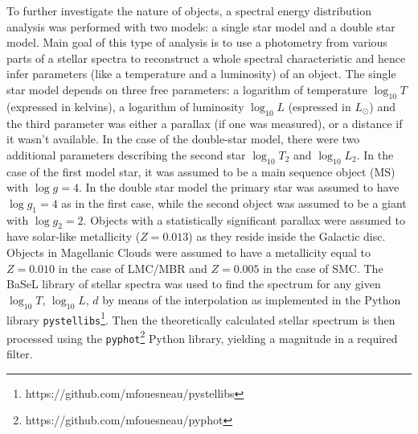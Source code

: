\documentclass{pracalicmgr}
\begin{document}
To further investigate the nature of objects, a spectral energy distribution analysis was
performed with two models: a single star model and a double star model. Main goal of this type of analysis is to use a photometry from various parts of a stellar spectra to
reconstruct a whole spectral characteristic and hence infer parameters (like a temperature and a luminosity) of an object.
The single star model depends on three free parameters: a logarithm of temperature $\log_{10}T$ (expressed in kelvins), a logarithm of luminosity $\log_{10} L$ (espressed in $L_{\odot}$) and the third
parameter was either a parallax (if one was measured), or a distance if it wasn't available. In the case of the double-star model, there were two additional parameters describing the
second star $\log_{10} T_2$ and $\log_{10} L_2$. In the case of the first model star, it was assumed to be a main sequence object (MS) with $\log{g}=4$. In the double star model the primary star
was assumed to have $\log{g_1}=4$ as in the first case, while the second object was assumed to be a giant with $\log{g_2}=2$. Objects with a statistically significant parallax were assumed to have solar-like
metallicity ($Z=0.013$) as they reside inside the Galactic disc. Objects in Magellanic Clouds
were assumed to have a metallicity equal to $Z=0.010$ in the case of LMC/MBR and $Z=0.005$ in the case of SMC.
The BaSeL library of stellar spectra \citep{lejeune_standard_1998} was used to find the spectrum for any given $\log_{10}{T}$, $\log_{10} L$, $d$ 
by means of the interpolation as implemented in the Python library
\texttt{pystellibs}\footnote{https://github.com/mfouesneau/pystellibs}.
Then the theoretically calculated stellar spectrum is then processed using the \texttt{pyphot}\footnote{https://github.com/mfouesneau/pyphot} 
Python library, yielding a magnitude in a required filter.
\end{document}
